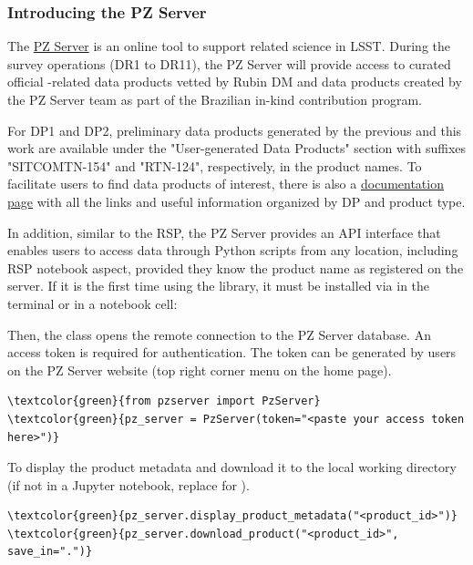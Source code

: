 \subsubsection{Introducing the PZ Server}

The \href{https://pzserver.linea.org.br}{PZ Server} is an online tool to support \photoz related science in LSST. During the survey operations (DR1 to DR11), the PZ Server will provide access to curated official \photoz-related data products vetted by Rubin DM and data products created by the PZ Server team as part of the Brazilian in-kind contribution program. 

For DP1 and DP2, preliminary data products generated by the previous \cite{SITCOMTN-154} and this work are available under the "User-generated Data Products" section with suffixes "SITCOMTN-154" and "RTN-124", respectively, in the product names. To facilitate users to find data products of interest, there is also a  \href{https://data.linea.org.br/en/sci_products/pzserver.html}{documentation page} with all the links and useful information organized by DP and product type.   

In addition, similar to the RSP, the PZ Server provides an API interface that enables users to access data through Python scripts from any location, including RSP notebook aspect, provided they know the product name as registered on the server. If it is the first time using the library, it must be installed via  in the terminal or in a notebook cell: 

Then, the  class opens the remote connection to the PZ Server database. An access token is required for authentication. The token can be generated by users on the PZ Server website (top right corner menu on the home page).    

\begin{Verbatim}[commandchars=\\\{\}]
\textcolor{green}{from pzserver import PzServer}
\textcolor{green}{pz_server = PzServer(token="<paste your access token here>")}
\end{Verbatim}

To display the product metadata and download it to the local working directory (if not in a Jupyter notebook, replace  for ).   

\begin{Verbatim}[commandchars=\\\{\}]
\textcolor{green}{pz_server.display_product_metadata("<product_id>")}
\textcolor{green}{pz_server.download_product("<product_id>", save_in=".")} 
\end{Verbatim}

